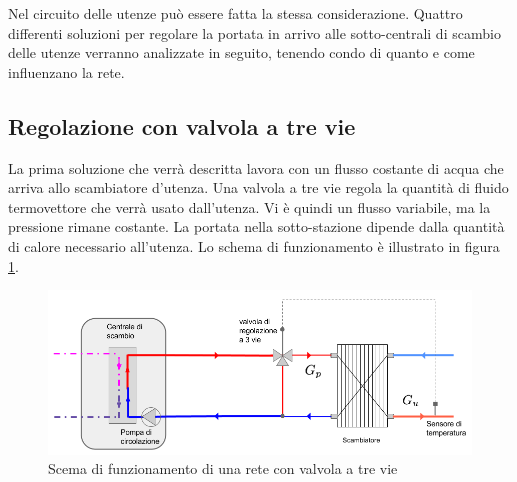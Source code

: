 \documentclass[laurea,oneside,11pt]{USiena_tesiLM}
\begin{document}
Nel circuito delle utenze può essere fatta la stessa considerazione. Quattro differenti soluzioni per regolare la portata in arrivo alle sotto-centrali di scambio delle utenze verranno analizzate in seguito, tenendo condo di quanto e come influenzano la rete.

\subsection{Regolazione con valvola a tre vie}
\label{subsec:3vie}
La prima soluzione che verrà descritta lavora con un flusso costante di acqua che arriva allo scambiatore d'utenza. Una valvola a tre vie regola la quantità di fluido termovettore che verrà usato dall'utenza. Vi è quindi un flusso variabile, ma la pressione rimane costante. La portata nella sotto-stazione dipende dalla quantità di calore necessario all'utenza.  Lo schema di funzionamento è illustrato in figura \ref{fig:3vie}.

\begin{figure}[!ht]
\centering
\includegraphics[width=\textwidth]{figure/3vie}
\caption{Scema di funzionamento di una rete con valvola a tre vie}
\label{fig:3vie}

\end{figure}
\end{document}
